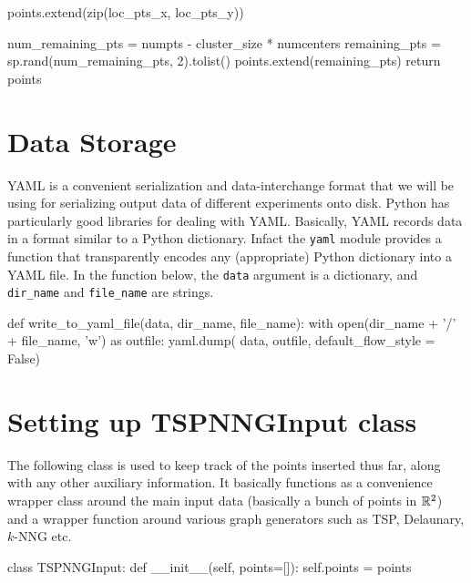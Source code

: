         points.extend(zip(loc_pts_x, loc_pts_y))

    num_remaining_pts = numpts - cluster_size * numcenters
    remaining_pts = sp.rand(num_remaining_pts, 2).tolist()
    points.extend(remaining_pts)
    return points
\nwendcode{}\nwdocspar

\section{Data Storage}
YAML\cite{ben2009yaml} is a convenient serialization and data-interchange format that we will be using 
for serializing output data of different experiments onto disk. Python has particularly good libraries for dealing with YAML. Basically, 
YAML records data in a format similar to a Python dictionary. Infact the \texttt{yaml} module provides a function that
transparently encodes any (appropriate) Python dictionary into a YAML file. In the function below, the 
\texttt{data} argument is a dictionary, and \texttt{dir\_name} and \texttt{file\_name} are strings. 
 
\nwenddocs{}\endmoddef\nwstartdeflinemarkup{}\nwenddeflinemarkup
def write_to_yaml_file(data, dir_name, file_name):
   with open(dir_name + '/' + file_name, 'w') as outfile:
          yaml.dump( data, outfile, default_flow_style = False)
\nwendcode{}\nwdocspar


\section{Setting up TSPNNGInput class}

The following class is used to keep track of the points inserted thus far, along with 
any other auxiliary information. It basically functions as a convenience wrapper class around 
the main input data (basically a bunch of points in $\mathbb{R}^2$) and a wrapper function around 
various graph generators such as TSP, Delaunary, $k\text{-}$NNG etc. 

\nwenddocs{}\plusendmoddef\nwstartdeflinemarkup{}\nwenddeflinemarkup
class TSPNNGInput:
      def __init__(self, points=[]):
          self.points            = points

